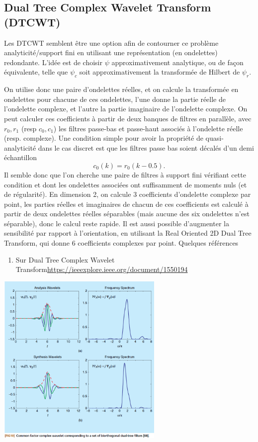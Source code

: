 \documentclass[11pt]{article} %
\begin{document}
\subsection{Dual Tree Complex Wavelet Transform (DTCWT)}
Les DTCWT semblent être une option afin de contourner ce problème analyticité/support fini en utilisant une représentation (en ondelettes) redondante. L'idée est de choisir $\psi$ approximativement analytique, ou de façon équivalente, telle que $\psi_c$ soit approximativement la transformée de Hilbert de $\psi_r$.
\par
On utilise donc une paire d'ondelettes réelles, et on calcule la transformée en ondelettes pour chacune de ces ondelettes, l'une donne la partie réelle de l'ondelette complexe, et l'autre la partie imaginaire de l'ondelette complexe.
\newline
On peut calculer ces coefficients à partir de deux banques de filtres en parallèle, avec $r_0, r_1$ (resp $c_0, c_1$) les filtres passe-bas et passe-haut associés à l'ondelette réelle (resp. complexe).
\newline
Une condition simple pour avoir la propriété de quasi-analyticité dans le cas discret est que les filtres passe bas soient décalés d'un demi échantillon
\begin{equation}
	c_0(k) = r_0(k-0.5).
\end{equation}
Il semble donc que l'on cherche une paire de filtres à support fini vérifiant cette condition et dont les ondelettes associées ont suffisamment de moments nuls (et de régularité).
\newline
En dimension 2, on calcule 3 coefficients d'ondelette complexe par point, les parties réelles et imaginaires de chacun de ces coefficients est calculé à partir de deux ondelettes réelles séparables (mais aucune des six ondelettes n'est séparable), donc le calcul reste rapide.
Il est aussi possible d'augmenter la sensibilité par rapport à l'orientation, en utilisant la Real Oriented 2D Dual Tree Transform, qui donne 6 coefficients complexes par point.
\newline
Quelques références
\begin{enumerate}
	\item Sur Dual Tree Complex Wavelet Transform\url{https://ieeexplore.ieee.org/document/1550194}
\end{enumerate}
\includegraphics[width=0.6\textwidth]{dtcwt_wav}
\end{document}
